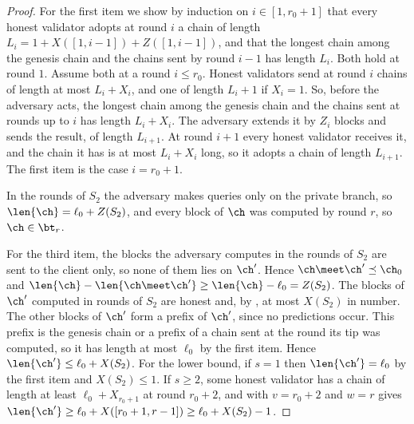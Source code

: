 \begin{proof}
    For the first item we show by induction on $i\in[1,r_0+1]$ that every
    honest validator adopts at round $i$ a chain of length
    $L_i=1+X([1,i-1])+Z([1,i-1])$, and that the longest chain among the
    genesis chain and the chains sent by round $i-1$ has length $L_i$. Both
    hold at round $1$. Assume both at a round $i\le r_0$. Honest validators send at round $i$ chains of length at most $L_i+X_i$,
    and one of length $L_i+1$ if $X_i=1$. So, before the adversary acts, the
    longest chain among the genesis chain and the chains sent at rounds up to
    $i$ has length $L_i+X_i$. The adversary
    extends it by $Z_i$ blocks and sends the result, of length $L_{i+1}$. At
    round $i+1$ every honest validator receives it, and the chain it has is
    at most $L_i+X_i$ long, so it adopts a chain of length $L_{i+1}$. The
    first item is the case $i=r_0+1$.

    In the rounds of $S_2$ the adversary makes queries only on the private
    branch, so $\len{\ch}=\ell_0+Z(S_2)$, and every block of $\ch$ was
    computed by round $r$, so $\ch\in\bt_r$.

    For the third item, the blocks the adversary computes in the rounds of
    $S_2$ are sent to the client only, so none of them lies on $\ch'$. Hence
    $\ch\meet\ch'\preceq\ch_0$ and
    $\len{\ch}-\len{\ch\meet\ch'}\ge\len{\ch}-\ell_0=Z(S_2)$. The blocks of
    $\ch'$ computed in rounds of $S_2$ are honest and, by ,
    at most $X(S_2)$ in number. The other blocks of $\ch'$ form a prefix of
    $\ch'$, since no predictions occur. This prefix is the genesis chain or a prefix of a chain sent at the round
    its tip was computed, so it has length at most
    $\ell_0$ by the first item. Hence $\len{\ch'}\le\ell_0+X(S_2)$. For the
    lower bound, if $s=1$ then $\len{\ch'}=\ell_0$ by the first item and
    $X(S_2)\le1$. If $s\ge2$, some honest validator has a chain of length at
    least $\ell_0+X_{r_0+1}$ at round $r_0+2$, and  with
    $v=r_0+2$ and $w=r$ gives
    $\len{\ch'}\ge\ell_0+X([r_0+1,r-1])\ge\ell_0+X(S_2)-1$.
\end{proof}

